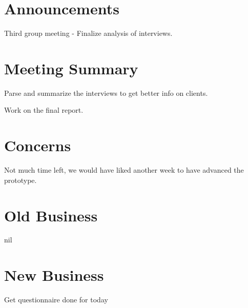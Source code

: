 \documentclass[11pt]{meetingmins}
\begin{document}
\maketitle

\section{Announcements}
\begin{hiddenitems}
\item Third group meeting - Finalize analysis of interviews.

\end{hiddenitems}

\section{Meeting Summary}
\begin{items}

\item
Parse and summarize the interviews to get better info on clients.

\item
Work on the final report.

\end{items}


\section{Concerns}
\begin{items}
\item Not much time left, we would have liked another week to have advanced the prototype.
\end{items}

\section{Old Business}
\begin{items}

\item nil

\end{items}

\section{New Business}
\begin{items}
\item
Get questionnaire done for today

\item


\end{items}

\vspace{1em}
\end{document}
